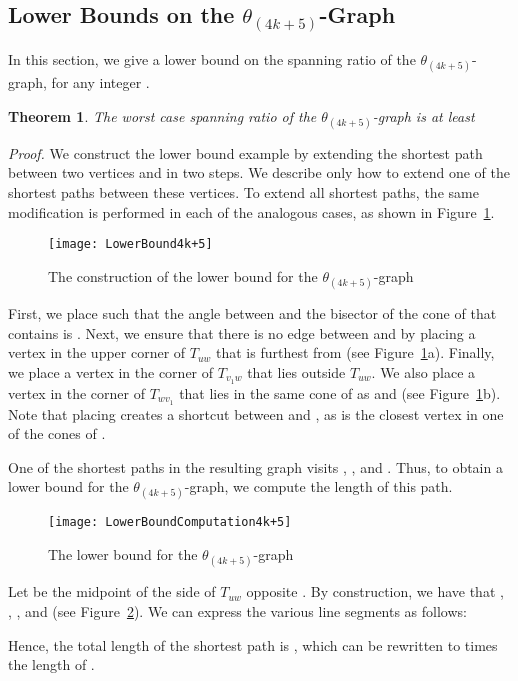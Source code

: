 \documentclass[12pt]{article}
\newtheorem{theo}[defin]{Theorem}
\newenvironment{theorem}{\begin{theo} \sl}{\end{theo}}
\newenvironment{proof}{\emph{Proof.}}{\hfill \\}
\newcommand{\Graph}[1]{\ensuremath{\theta_{(4 k + #1)}}-Graph\xspace}
\newcommand{\graph}[1]{\ensuremath{\theta_{(4 k + #1)}}-graph\xspace}
\newcommand{\canon}[2]{\ensuremath{T_{#1 #2}}}
\begin{document}
\subsection{Lower Bounds on the \Graph{5}}
In this section, we give a lower bound on the spanning ratio of the \graph{5}, for any integer . 

\begin{theorem}
  The worst case spanning ratio of the \graph{5} is at least  
\end{theorem}
\begin{proof}
We construct the lower bound example by extending the shortest path between two vertices  and  in two steps. We describe only how to extend one of the shortest paths between these vertices. To extend all shortest paths, the same modification is performed in each of the analogous cases, as shown in Figure~\ref{fig:LowerBound4k+5}. 

\begin{figure}[ht]
  \begin{center}
    \texttt{[image: LowerBound4k+5]}
  \end{center}
  \caption{The construction of the lower bound for the \graph{5}}
  \label{fig:LowerBound4k+5}
\end{figure}

First, we place  such that the angle between  and the bisector of the cone of  that contains  is . Next, we ensure that there is no edge between  and  by placing a vertex  in the upper corner of \canon{u}{w} that is furthest from  (see Figure~\ref{fig:LowerBound4k+5}a). Finally, we place a vertex  in the corner of \canon{v_1}{w} that lies outside \canon{u}{w}. We also place a vertex  in the corner of \canon{w}{v_1} that lies in the same cone of  as  and  (see Figure~\ref{fig:LowerBound4k+5}b). Note that placing  creates a shortcut between  and , as  is the closest vertex in one of the cones of . 

One of the shortest paths in the resulting graph visits , , and . Thus, to obtain a lower bound for the \graph{5}, we compute the length of this path. 

\begin{figure}[ht]
  \begin{center}
    \texttt{[image: LowerBoundComputation4k+5]}
  \end{center}
  \caption{The lower bound for the \graph{5}}
  \label{fig:LowerBoundComputation4k+5}
\end{figure}

Let  be the midpoint of the side of \canon{u}{w} opposite . By construction, we have that , , , and  (see Figure~\ref{fig:LowerBoundComputation4k+5}). We can express the various line segments as follows: 


Hence, the total length of the shortest path is , which can be rewritten to    times the length of .
\end{proof}
\end{document}
